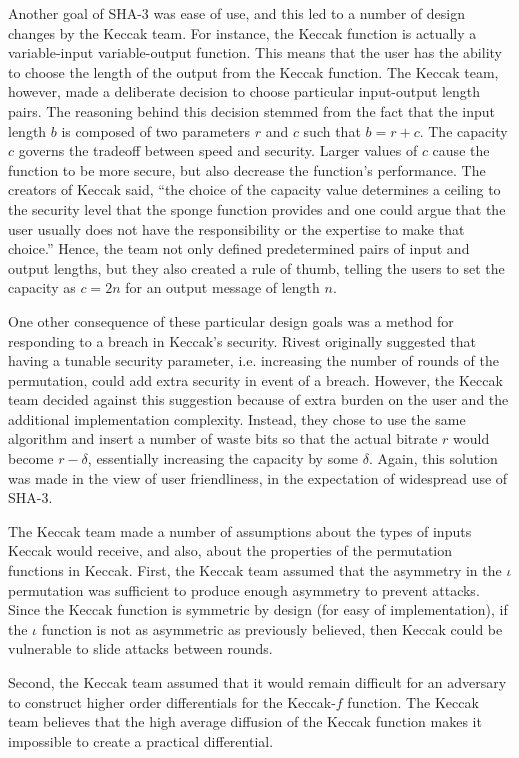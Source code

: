 \documentclass[psamsfonts]{amsart}
\begin{document}
Another goal of SHA-3 was ease of use, and this led to a number of design changes by the Keccak team. For instance, the Keccak function is actually a variable-input variable-output function. This means that the user has the ability to choose the length of the output from the Keccak function. The Keccak team, however, made a deliberate decision to choose particular input-output length pairs. The reasoning behind this decision stemmed from the fact that the input length $b$ is composed of two parameters $r$ and $c$ such that $b = r + c$. The capacity $c$ governs the tradeoff between speed and security. Larger values of $c$ cause the function to be more secure, but also decrease the function's performance. The creators of Keccak said, ``the choice of the capacity value determines a ceiling to the security level that the sponge function provides and one could argue that the user usually does not have the responsibility or the expertise to make that choice.'' Hence, the team not only defined predetermined pairs of input and output lengths, but they also created a rule of thumb, telling the users to set the capacity as $c = 2n$ for an output message of length $n$.

One other consequence of these particular design goals was a method for responding to a breach in Keccak's security. Rivest originally suggested that having a tunable security parameter, i.e. increasing the number of rounds of the permutation, could add extra security in event of a breach. However, the Keccak team decided against this suggestion because of extra burden on the user and the additional implementation complexity. Instead, they chose to use the same algorithm and insert a number of waste bits so that the actual bitrate $r$ would become $r - \delta$, essentially increasing the capacity by some $\delta$. Again, this solution was made in the view of user friendliness, in the expectation of widespread use of SHA-3.

The Keccak team made a number of assumptions about the types of inputs Keccak would receive, and also, about the properties of the permutation functions in Keccak. First, the Keccak team assumed that the asymmetry in the $\iota$ permutation was sufficient to produce enough asymmetry to prevent attacks. Since the Keccak function is symmetric by design (for easy of implementation), if the $\iota$ function is not as asymmetric as previously believed, then Keccak could be vulnerable to slide attacks between rounds.

Second, the Keccak team assumed that it would remain difficult for an adversary to construct higher order differentials for the Keccak-$f$ function. The Keccak team believes that the high average diffusion of the Keccak function makes it impossible to create a practical differential.
\end{document}

